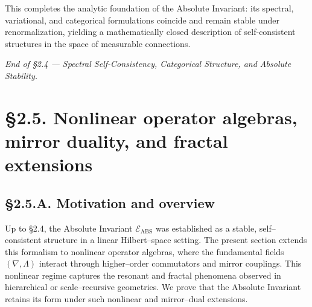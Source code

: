 This completes the analytic foundation of the Absolute Invariant: its spectral, variational, and categorical formulations coincide and remain stable under renormalization, yielding a mathematically closed description of self-consistent structures in the space of measurable connections.

\begin{center}
\textit{End of §2.4 — Spectral Self-Consistency, Categorical Structure, and Absolute Stability.}
\end{center}


\section{§2.5. Nonlinear operator algebras, mirror duality, and fractal extensions}
\label{sec:2.5-fractal}

\subsection*{§2.5.A. Motivation and overview}

Up to §2.4, the Absolute Invariant $\mathcal{E}_{\mathrm{ABS}}$ was established as a stable, self–consistent structure in a linear Hilbert–space setting.
The present section extends this formalism to nonlinear operator algebras, where the fundamental fields $(\nabla,\Lambda)$ interact through higher–order commutators and mirror couplings.
This nonlinear regime captures the resonant and fractal phenomena observed in hierarchical or scale–recursive geometries.
We prove that the Absolute Invariant retains its form under such nonlinear and mirror–dual extensions.

